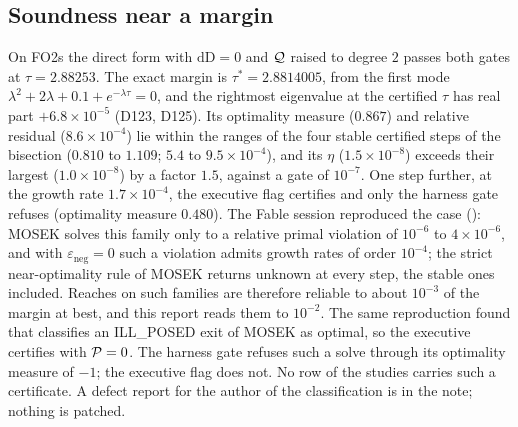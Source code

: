 \subsection{Soundness near a margin}\label{sec:st-sound}

On FO2s the direct form with $\mathrm{dD}=0$ and $\mathcal{Q}$ raised to degree $2$ passes both gates at $\tau=2.88253$. The exact margin is $\tau^*=2.8814005$, from the first mode $\lambda^2+2\lambda+0.1+e^{-\lambda\tau}=0$, and the rightmost eigenvalue at the certified $\tau$ has real part $+6.8\times10^{-5}$ (D123, D125). Its optimality measure ($0.867$) and relative residual ($8.6\times10^{-4}$) lie within the ranges of the four stable certified steps of the bisection ($0.810$ to $1.109$; $5.4$ to $9.5\times10^{-4}$), and its $\eta$ ($1.5\times10^{-8}$) exceeds their largest ($1.0\times10^{-8}$) by a factor $1.5$, against a gate of $10^{-7}$. One step further, at the growth rate $1.7\times10^{-4}$, the executive flag certifies and only the harness gate refuses (optimality measure $0.480$). The Fable session reproduced the case (): MOSEK solves this family only to a relative primal violation of $10^{-6}$ to $4\times10^{-6}$, and with $\varepsilon_{\mathrm{neg}}=0$ such a violation admits growth rates of order $10^{-4}$; the strict near-optimality rule of MOSEK returns unknown at every step, the stable ones included. Reaches on such families are therefore reliable to about $10^{-3}$ of the margin at best, and this report reads them to $10^{-2}$. The same reproduction found that  classifies an ILL\_POSED exit of MOSEK as optimal, so the executive certifies with $\mathcal{P}=0$. The harness gate refuses such a solve through its optimality measure of $-1$; the executive flag does not. No row of the studies carries such a certificate. A defect report for the author of the classification is in the note; nothing is patched.
